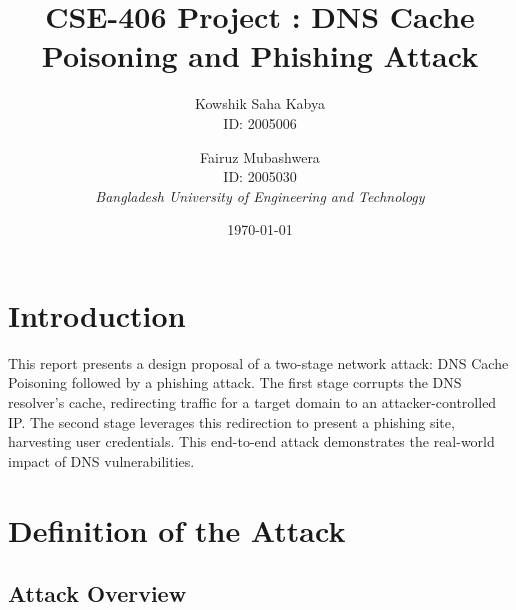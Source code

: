 \documentclass[12pt,a4paper]{article}
\title{CSE-406 Project : DNS Cache Poisoning and Phishing Attack}
\author{
    Kowshik Saha Kabya\\
    ID: 2005006
    \and
    Fairuz Mubashwera\\
    ID: 2005030
    \\[1em]
    \textit{Bangladesh University of Engineering and Technology}
}
\date{\today}
\begin{document}
\maketitle

\pagebreak

\tableofcontents
\newpage

\section{Introduction}

This report presents a design proposal of a two-stage network attack: DNS Cache Poisoning followed by a phishing attack. The first stage corrupts the DNS resolver's cache, redirecting traffic for a target domain to an attacker-controlled IP. The second stage leverages this redirection to present a phishing site, harvesting user credentials. This end-to-end attack demonstrates the real-world impact of DNS vulnerabilities.

\section{Definition of the Attack}

\subsection{Attack Overview}
\end{document}
